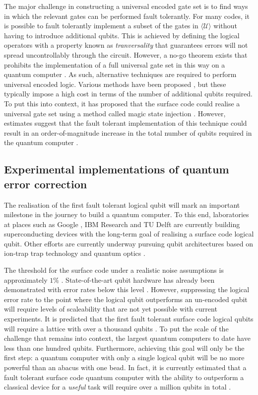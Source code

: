 \documentclass[]{arxiv}
\theoremstyle{plain}%
\theoremstyle{definition}
\theoremstyle{remark}
\begin{document}
The major challenge in constructing a universal encoded gate set is to find ways in which the relevant gates can be performed fault tolerantly. For many codes, it is possible to fault tolerantly implement a subset of the gates in $\langle \mathcal{U} \rangle$ without having to introduce additional qubits. This is achieved by defining the logical operators with a property known as \textit{tranversality} that guarantees errors will not spread uncontrollably through the circuit. However, a no-go theorem exists that prohibits the implementation of a full universal gate set in this way on a quantum computer \cite{Eastin09}. As such, alternative techniques are required to perform universal encoded logic. Various methods have been proposed \cite{Bravyi05,Landahl14,Yoder17,Vasmer18}, but these typically impose a high cost in terms of the number of additional qubits required. To put this into context, it has proposed that the surface code could realise a universal gate set using a method called magic state injection \cite{Bravyi05}. However, estimates suggest that the fault tolerant implementation of this technique could result in an order-of-magnitude increase in the total number of qubits required in the quantum computer \cite{Campbell17}.


\subsection{Experimental implementations of quantum error correction}
The realisation of the first fault tolerant logical qubit will mark an important milestone in the journey to build a quantum computer. To this end, laboratories at places such as Google \cite{Kelly16}, IBM Research \cite{Gambetta2017,Takita2017} and TU Delft \cite{Rist2015} are currently building superconducting devices with the long-term goal of realising a surface code logical qubit. Other efforts are currently underway pursuing qubit architectures based on ion-trap trap technology \cite{Nickerson14} and quantum optics \cite{Qiang18}.

The threshold for the surface code under a realistic noise assumptions is approximately $1\%$ \cite{Wang10}. State-of-the-art qubit hardware has already been demonstrated with error rates below this level \cite{Chow12,Harty14}. However, suppressing the logical error rate to the point where the logical qubit outperforms an un-encoded qubit will require levels of scaleability that are not yet possible with current experiments. It is predicted that the first fault tolerant surface code logical qubits will require a lattice with over a thousand qubits \cite{Fowler12}. To put the scale of the challenge that remains into context, the largest quantum computers to date have less than one hundred qubits. Furthermore, achieving this goal will only be the first step: a quantum computer with only a single logical qubit will be no more powerful than an abacus with one bead. In fact, it is currently estimated that a fault tolerant surface code quantum computer with the ability to outperform a classical device for a \textit{useful} task will require over a million qubits in total \cite{OGorman17,Campbell17}.
\end{document}
